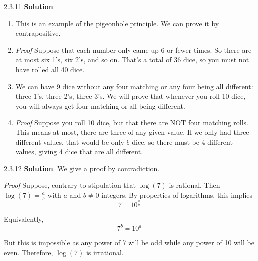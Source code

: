 \documentclass[11pt,]{book}
\makeatletter
\theoremstyle{ptxplainnotitle}
\theoremstyle{ptxplaintitle}
\renewcommand*{\proofname}{Proof}
\renewenvironment{proof}[1][\proofname]{\par
  \pushQED{\qed}%
  \normalfont \topsep6\p@\@plus6\p@\relax
  \trivlist
  \item\relax
    {\itshape
    #1\@addpunct{.}}\hspace\labelsep\ignorespaces
}{%
  \popQED\endtrivlist\@endpefalse
}
\theoremstyle{ptxdefinitionnotitle}
\theoremstyle{ptxdefinitiontitle}
\theoremstyle{ptxdefinitionnotitle}
\theoremstyle{ptxdefinitiontitle}
\theoremstyle{ptxdefinitionnotitle}
\theoremstyle{ptxdefinitiontitle}
\theoremstyle{ptxdefinitiontitlenonumber}
\theoremstyle{ptxdefinitiontitlenonumber}
\numberwithin{equation}{chapter}
\makeatother
\begin{document}
\begin{divisionexercise}{2.3.11}
\textbf{Solution}.\quad%
\hypertarget{p-2658}{}%
\leavevmode%
\begin{enumerate}[label=(\alph*)]
\item\hypertarget{li-1322}{}\hypertarget{p-2659}{}%
This is an example of the pigeonhole principle. We can prove it by contrapositive.%
\begin{proof}\hypertarget{proof-38}{}
\hypertarget{p-2660}{}%
Suppose that each number only came up 6 or fewer times. So there are at most six 1's, six 2's, and so on. That's a total of 36 dice, so you must not have rolled all 40 dice.%
\end{proof}
\item\hypertarget{li-1323}{}\hypertarget{p-2661}{}%
We can have 9 dice without any four matching or any four being all different: three 1's, three 2's, three 3's. We will prove that whenever you roll 10 dice, you will always get four matching or all being different.%
\begin{proof}\hypertarget{proof-39}{}
\hypertarget{p-2662}{}%
Suppose you roll 10 dice, but that there are NOT four matching rolls. This means at most, there are three of any given value. If we only had three different values, that would be only 9 dice, so there must be 4 different values, giving 4 dice that are all different.%
\end{proof}
\end{enumerate}
%
\end{divisionexercise}%
\begin{divisionexercise}{2.3.12}
\textbf{Solution}.\quad%
\hypertarget{p-2664}{}%
We give a proof by contradiction.%
\begin{proof}\hypertarget{proof-40}{}
\hypertarget{p-2665}{}%
Suppose, contrary to stipulation that \(\log(7)\) is rational. Then \(\log(7) = \frac{a}{b}\) with \(a\) and \(b \ne 0\) integers. By properties of logarithms, this implies%
\begin{equation*}
7 = 10^{\frac{a}{b}}
\end{equation*}
%
\par
\hypertarget{p-2666}{}%
Equivalently,%
\begin{equation*}
7^b = 10^a
\end{equation*}
%
\par
\hypertarget{p-2667}{}%
But this is impossible as any power of 7 will be odd while any power of 10 will be even.  Therefore, \(\log(7)\) is irrational.%
\end{proof}
\end{divisionexercise}%
\end{document}
